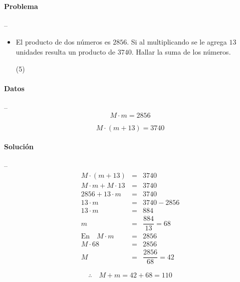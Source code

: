 \documentclass[12pt, a4paper]{article}
\begin{document}
\paragraph*{Problema} -- \\
\begin{itemize}
	\item{El producto de dos números es $2856$. Si al multiplicando se le agrega $13$ unidades resulta un producto de $3740$. Hallar la suma de los números.

	\begin{tasks}(5)
	\end{tasks}
	}
\end{itemize}
\paragraph*{Datos} -- \\

$$
M \cdot m = 2856 
$$

$$
M \cdot (m + 13) = 3740 
$$

\paragraph*{Solución} -- 
\begin{eqnarray*}
M \cdot (m + 13) &=& 3740 \\
M\cdot m + M \cdot 13 &=& 3740 \\
2856 + 13 \cdot m &=& 3740  \\
13 \cdot m &=& 3740 - 2856 \\ 
13 \cdot m &=& 884 \\ 
m &=& \dfrac{884}{13} = 68\\
\text{En}\quad M \cdot m &=& 2856 \\
M \cdot 68 &=& 2856 \\
M &=& \dfrac{2856}{68} = 42
\end{eqnarray*}

$$
\therefore\quad M + m = 42 + 68 = 110
$$
\end{document}
